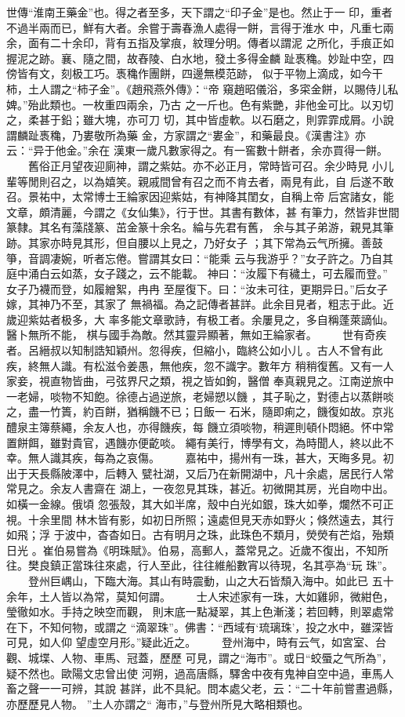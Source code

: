 \documentclass{ctexart}
\begin{document}
世傳``淮南王藥金''也。得之者至多，天下謂之``印子金''是也。然止于一 印，重者不過半兩而已，鮮有大者。余嘗于壽春漁人處得一餅，言得于淮水 中，凡重七兩余，面有二十余印，背有五指及掌痕，紋理分明。傳者以謂泥 之所化，手痕正如握泥之跡。襄、隨之間，故舂陵、白水地，發土多得金麟 趾褭穐。妙趾中空，四傍皆有文，刻极工巧。褭穐作團餅，四邊無模范跡， 似于平物上滴成，如今干柿，土人謂之``柿子金''。《趙飛燕外傳》：``帝 窺趙昭儀浴，多寀金餅，以賜侍儿私婢。''殆此類也。一枚重四兩余，乃古 之一斤也。色有紫艷，非他金可比。以刃切之，柔甚于鉛；雖大塊，亦可刀 切，其中皆虛軟。以石磨之，則霏霏成屑。小說謂麟趾褭穐，乃婁敬所為藥 金，方家謂之``婁金''，和藥最良。《漢書注》亦云：``异于他金。''余在 漢東一歲凡數家得之。有一窖數十餅者，余亦買得一餅。 　　舊俗正月望夜迎廁神，謂之紫姑。亦不必正月，常時皆可召。余少時見 小儿輩等閒則召之，以為嬉笑。親戚間曾有召之而不肯去者，兩見有此，自 后遂不敢召。景祐中，太常博士王綸家因迎紫姑，有神降其閨女，自稱上帝 后宮諸女，能文章，頗清麗，今謂之《女仙集》，行于世。其書有數体，甚 有筆力，然皆非世間篆隸。其名有藻牋篆、茁金篆十余名。綸与先君有舊， 余与其子弟游，親見其筆跡。其家亦時見其形，但自腰以上見之，乃好女子 ；其下常為云气所擁。善鼓箏，音調凄婉，听者忘倦。嘗謂其女曰：``能乘 云与我游乎？''女子許之。乃自其庭中涌白云如蒸，女子踐之，云不能載。 神曰：``汝履下有穢土，可去履而登。'' 女子乃襪而登，如履繒絮，冉冉 至屋復下。曰：``汝未可往，更期异日。''后女子嫁，其神乃不至，其家了 無禍福。為之記傳者甚詳。此余目見者，粗志于此。近歲迎紫姑者极多，大 率多能文章歌詩，有极工者。余屢見之，多自稱蓬萊謫仙。醫卜無所不能， 棋与國手為敵。然其靈异顯著，無如王綸家者。 　　世有奇疾者。呂縉叔以知制誥知穎州。忽得疾，但縮小，臨終公如小儿 。古人不曾有此疾，終無人識。有松滋令姜愚，無他疾，忽不識字。數年方 稍稍復舊。又有一人家妾，視直物皆曲，弓弦界尺之類，視之皆如鉤，醫僧 奉真親見之。江南逆旅中一老婦，啖物不知飽。徐德占過逆旅，老婦愬以饑 ，其子恥之，對德占以蒸餅啖之，盡一竹簣，約百餅，猶稱饑不已；日飯一 石米，隨即痢之，饑復如故。京兆醴泉主簿蔡繩，余友人也，亦得饑疾，每 饑立須啖物，稍遲則頓仆悶絕。怀中常置餅餌，雖對貴官，遇饑亦便齕啖。 繩有美行，博學有文，為時聞人，終以此不幸。無人識其疾，每為之哀傷。 　　嘉祐中，揚州有一珠，甚大，天晦多見。初出于天長縣陂澤中，后轉入 甓社湖，又后乃在新開湖中，凡十余處，居民行人常常見之。余友人書齋在 湖上，一夜忽見其珠，甚近。初微開其房，光自吻中出。如橫一金線。俄頃 忽張殼，其大如半席，殼中白光如銀，珠大如拳，爛然不可正視。十余里間 林木皆有影，如初日所照；遠處但見天赤如野火；倏然遠去，其行如飛；浮 于波中，杳杳如日。古有明月之珠，此珠色不類月，熒熒有芒焰，殆類日光 。崔伯易嘗為《明珠賦》。伯易，高郵人，蓋常見之。近歲不復出，不知所 往。樊良鎮正當珠往來處，行人至此，往往維船數宵以待現，名其亭為``玩 珠''。 　　登州巨嵎山，下臨大海。其山有時震動，山之大石皆頹入海中。如此已 五十余年，土人皆以為常，莫知何謂。 　　士人宋述家有一珠，大如雞卵，微紺色，瑩徹如水。手持之映空而觀， 則末底一點凝翠，其上色漸淺；若回轉，則翠處常在下，不知何物，或謂之 ``滴翠珠''。佛書：``西域有`琉璃珠'，投之水中，雖深皆可見，如人仰 望虛空月形。''疑此近之。 　　登州海中，時有云气，如宮室、台觀、城堞、人物、車馬、冠蓋，歷歷 可見，謂之``海市''。或日``蛟蜃之气所為''，疑不然也。歐陽文忠曾出使 河朔，過高唐縣，驛舍中夜有鬼神自空中過，車馬人畜之聲一一可辨，其說 甚詳，此不具紀。問本處父老，云：``二十年前嘗晝過縣，亦歷歷見人物。 ''土人亦謂之`` 海市，''与登州所見大略相類也。 
\end{document}
